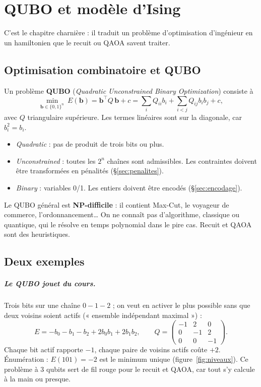 \chapter{QUBO et modèle d'Ising}\label{ch:qubo}

C'est le chapitre charnière : il traduit un problème d'optimisation d'ingénieur en un hamiltonien que le recuit ou QAOA savent traiter.

\section{Optimisation combinatoire et QUBO}
\begin{definition}[ (QUBO)]
Un problème \textbf{QUBO} (\emph{Quadratic Unconstrained Binary Optimization}) consiste à
\[\min_{\mathbf b\in\{0,1\}^n}\ E(\mathbf b)=\mathbf b^\top Q\,\mathbf b+c=\sum_iQ_{ii}b_i+\sum_{i<j}Q_{ij}b_ib_j+c,\]
avec $Q$ triangulaire supérieure. Les termes linéaires sont sur la diagonale, car $b_i^2=b_i$.
\end{definition}
\begin{itemize}
\item \emph{Quadratic} : pas de produit de trois bits ou plus.
\item \emph{Unconstrained} : toutes les $2^n$ chaînes sont admissibles. Les contraintes doivent être transformées en pénalités (§\ref{sec:penalites}).
\item \emph{Binary} : variables 0/1. Les entiers doivent être encodés (§\ref{sec:encodage}).
\end{itemize}
Le QUBO général est \textbf{NP-difficile} : il contient Max-Cut, le voyageur de commerce, l'ordonnancement… On ne connaît pas d'algorithme, classique ou quantique, qui le résolve en temps polynomial dans le pire cas. Recuit et QAOA sont des heuristiques.

\section{Deux exemples}
\paragraph{Le QUBO jouet du cours.} Trois bits sur une chaîne $0-1-2$ ; on veut en activer le plus possible sans que deux voisins soient actifs (« ensemble indépendant maximal ») :
\[E=-b_0-b_1-b_2+2b_0b_1+2b_1b_2,\qquad Q=\begin{pmatrix}-1&2&0\\0&-1&2\\0&0&-1\end{pmatrix}.\]
Chaque bit actif rapporte $-1$, chaque paire de voisins actifs coûte $+2$. Énumération : $E(101)=-2$ est le minimum unique (figure~\ref{fig:niveaux}). Ce problème à 3 qubits sert de fil rouge pour le recuit et QAOA, car tout s'y calcule à la main ou presque.

